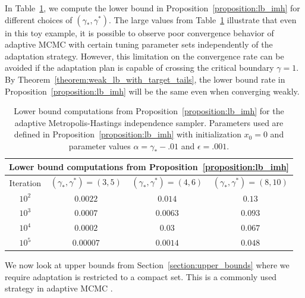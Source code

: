 \documentclass[12pt]{article}
\theoremstyle{plain}
\theoremstyle{remark}
\newcommand{\e}{\epsilon}
\begin{document}
In Table~\ref{table:mhi_lb}, we compute the lower bound in Proposition~\ref{proposition:lb_imh} for different choices of $(\gamma_*, \gamma^*)$.
The large values from Table~\ref{table:mhi_lb} illustrate that even in this toy example, it is possible to observe poor convergence behavior of adaptive MCMC with certain tuning parameter sets independently of the adaptation strategy.
However, this limitation on the convergence rate can be avoided if the adaptation plan is capable of crossing the critical boundary $\gamma = 1$.
By Theorem~\ref{theorem:weak_lb_with_target_tails}, the lower bound rate in Proposition~\ref{proposition:lb_imh} will be the same even when converging weakly.

\begin{table}
\begin{center}
\renewcommand{\arraystretch}{1.5}
\begin{tabular}[t]{| c | c | c | c |}
\hline
\multicolumn{4}{|c|}{Lower bound computations from Proposition~\ref{proposition:lb_imh}} \\
\hline
Iteration & $(\gamma_*, \gamma^*) = (3, 5)$ & $(\gamma_*, \gamma^*) = (4, 6)$ & $(\gamma_*, \gamma^*) = (8, 10)$ \\ 
\hline
$10^2$ & $0.0022$ & $0.014$ & $0.13$ 
\\
\hline
$10^3$ & $0.0007$ & $0.0063$ & $0.093$ 
\\
\hline
$10^4$ & $0.0002$ & $0.03$ & $0.067$ 
\\
\hline
$10^5$ & $0.00007$ & $0.0014$ & $0.048$ 
\\
\hline
\end{tabular}
\end{center}
\caption{
Lower bound computations from Proposition~\ref{proposition:lb_imh} for the adaptive Metropolis-Hastings independence sampler. Parameters used are defined in Proposition~\ref{proposition:lb_imh} with initialization $x_0 = 0$ and parameter values $\alpha = \gamma_* - .01$ and $\e = .001$.
}
\label{table:mhi_lb}
\end{table}

We now look at upper bounds from Section~\ref{section:upper_bounds} where we require adaptation is restricted to a compact set. This is a commonly used strategy in adaptive MCMC \citep{pompe:etal:2020}.
\end{document}
